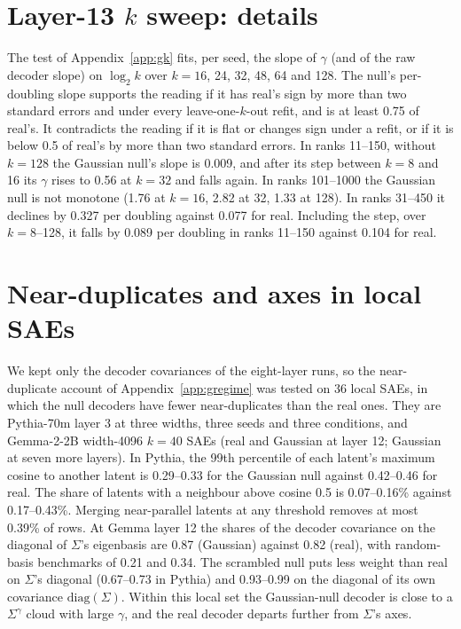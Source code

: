 \documentclass{article}
\newcommand{\Sig}{\Sigma}
\begin{document}
\section{Layer-13 $k$ sweep: details}
\label{app:ksweep}

The test of Appendix~\ref{app:gk} fits, per seed, the slope of $\gamma$ (and of the raw decoder slope) on $\log_2 k$ over $k=16$, 24, 32, 48, 64 and 128. The null's per-doubling slope supports the reading if it has real's sign by more than two standard errors and under every leave-one-$k$-out refit, and is at least 0.75 of real's. It contradicts the reading if it is flat or changes sign under a refit, or if it is below 0.5 of real's by more than two standard errors. In ranks 11--150, without $k=128$ the Gaussian null's slope is 0.009, and after its step between $k=8$ and 16 its $\gamma$ rises to 0.56 at $k=32$ and falls again. In ranks 101--1000 the Gaussian null is not monotone (1.76 at $k=16$, 2.82 at 32, 1.33 at 128). In ranks 31--450 it declines by 0.327 per doubling against 0.077 for real. Including the step, over $k=8$--128, it falls by 0.089 per doubling in ranks 11--150 against 0.104 for real.

\section{Near-duplicates and axes in local SAEs}
\label{app:regime}

We kept only the decoder covariances of the eight-layer runs, so the near-duplicate account of Appendix~\ref{app:gregime} was tested on 36 local SAEs, in which the null decoders have fewer near-duplicates than the real ones. They are Pythia-70m layer 3 at three widths, three seeds and three conditions, and Gemma-2-2B width-4096 $k=40$ SAEs (real and Gaussian at layer 12; Gaussian at seven more layers). In Pythia, the 99th percentile of each latent's maximum cosine to another latent is 0.29--0.33 for the Gaussian null against 0.42--0.46 for real. The share of latents with a neighbour above cosine 0.5 is 0.07--0.16\% against 0.17--0.43\%. Merging near-parallel latents at any threshold removes at most 0.39\% of rows. At Gemma layer 12 the shares of the decoder covariance on the diagonal of $\Sig$'s eigenbasis are 0.87 (Gaussian) against 0.82 (real), with random-basis benchmarks of 0.21 and 0.34. The scrambled null puts less weight than real on $\Sig$'s diagonal (0.67--0.73 in Pythia) and 0.93--0.99 on the diagonal of its own covariance $\mathrm{diag}(\Sig)$. Within this local set the Gaussian-null decoder is close to a $\Sig^{\gamma}$ cloud with large $\gamma$, and the real decoder departs further from $\Sig$'s axes.
\end{document}
